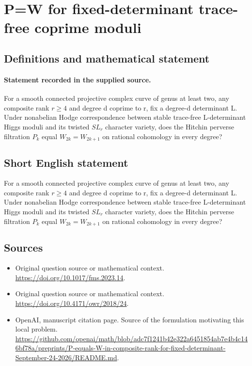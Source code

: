 \documentclass[11pt]{article}
\begin{document}
\section*{P=W for fixed-determinant trace-free coprime moduli}\label{statement}
\subsection{Definitions and mathematical statement}
\paragraph{Statement recorded in the supplied source.}
For a smooth connected projective complex curve of genus at least two, any composite rank $r\geq 4$ and degree d coprime to r, fix a degree-d determinant L. Under nonabelian Hodge correspondence between stable trace-free L-determinant Higgs moduli and its twisted $SL_r$ character variety, does the Hitchin perverse filtration $P_k$ equal $W_{2k}=W_{2k+1}$ on rational cohomology in every degree?
\subsection{Short English statement}
For a smooth connected projective complex curve of genus at least two, any composite rank $r\geq 4$ and degree d coprime to r, fix a degree-d determinant L. Under nonabelian Hodge correspondence between stable trace-free L-determinant Higgs moduli and its twisted $SL_r$ character variety, does the Hitchin perverse filtration $P_k$ equal $W_{2k}=W_{2k+1}$ on rational cohomology in every degree?
\subsection{Sources}
\begin{itemize}
\item[S1] Original question source or mathematical context.
\url{https://doi.org/10.1017/fms.2023.14}.
\item[S2] Original question source or mathematical context.
\url{https://doi.org/10.4171/owr/2018/24}.
\item[S3] OpenAI, manuscript citation page. Source of the formulation motivating this local problem.
\url{https://github.com/openai/math/blob/adc7f1241b42e322a6451854ab7e4b4c146bf78a/preprints/P-equals-W-in-composite-rank-for-fixed-determinant-September-24-2026/README.md}.
\end{itemize}
\end{document}
